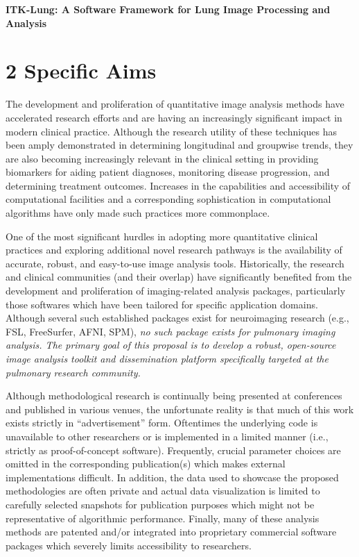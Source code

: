 \documentclass[11pt,]{article}
\title{}
\author{}
\date{}
\begin{document}
\maketitle



\begin{center}
{\Large \bf ITK-Lung:  A Software Framework for Lung Image Processing and Analysis}
\end{center}

\section{2 Specific Aims}\label{specific-aims}

The development and proliferation of quantitative image analysis methods
have accelerated research efforts and are having an increasingly
significant impact in modern clinical practice. Although the research
utility of these techniques has been amply demonstrated in determining
longitudinal and groupwise trends, they are also becoming increasingly
relevant in the clinical setting in providing biomarkers for aiding
patient diagnoses, monitoring disease progression, and determining
treatment outcomes. Increases in the capabilities and accessibility of
computational facilities and a corresponding sophistication in
computational algorithms have only made such practices more commonplace.

One of the most significant hurdles in adopting more quantitative
clinical practices and exploring additional novel research pathways is
the availability of accurate, robust, and easy-to-use image analysis
tools. Historically, the research and clinical communities (and their
overlap) have significantly benefited from the development and
proliferation of imaging-related analysis packages, particularly those
softwares which have been tailored for specific application domains.
Although several such established packages exist for neuroimaging
research (e.g., FSL, FreeSurfer, AFNI, SPM), \emph{no such package
exists for pulmonary imaging analysis. The primary goal of this proposal
is to develop a robust, open-source image analysis toolkit and
dissemination platform specifically targeted at the pulmonary research
community.}

Although methodological research is continually being presented at
conferences and published in various venues, the unfortunate reality is
that much of this work exists strictly in ``advertisement'' form.
Oftentimes the underlying code is unavailable to other researchers or is
implemented in a limited manner (i.e., strictly as proof-of-concept
software). Frequently, crucial parameter choices are omitted in the
corresponding publication(s) which makes external implementations
difficult. In addition, the data used to showcase the proposed
methodologies are often private and actual data visualization is limited
to carefully selected snapshots for publication purposes which might not
be representative of algorithmic performance. Finally, many of these
analysis methods are patented and/or integrated into proprietary
commercial software packages which severely limits accessibility to
researchers.
\end{document}
